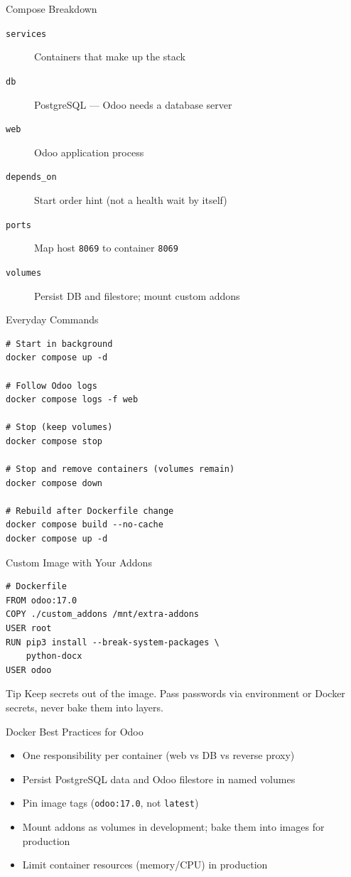 \begin{frame}{Compose Breakdown}
\begin{description}
  \item[\texttt{services}] Containers that make up the stack
  \item[\texttt{db}] PostgreSQL --- Odoo needs a database server
  \item[\texttt{web}] Odoo application process
  \item[\texttt{depends\_on}] Start order hint (not a health wait by itself)
  \item[\texttt{ports}] Map host \texttt{8069} to container \texttt{8069}
  \item[\texttt{volumes}] Persist DB and filestore; mount custom addons
\end{description}
\end{frame}

\begin{frame}[fragile]{Everyday Commands}
\begin{lstlisting}[style=bash]
# Start in background
docker compose up -d

# Follow Odoo logs
docker compose logs -f web

# Stop (keep volumes)
docker compose stop

# Stop and remove containers (volumes remain)
docker compose down

# Rebuild after Dockerfile change
docker compose build --no-cache
docker compose up -d
\end{lstlisting}
\end{frame}

\begin{frame}[fragile]{Custom Image with Your Addons}
\begin{lstlisting}[style=bash]
# Dockerfile
FROM odoo:17.0
COPY ./custom_addons /mnt/extra-addons
USER root
RUN pip3 install --break-system-packages \
    python-docx
USER odoo
\end{lstlisting}

\vspace{0.4em}
\begin{alertblock}{Tip}
  Keep secrets out of the image. Pass passwords via environment or Docker secrets, never bake them into layers.
\end{alertblock}
\end{frame}

\begin{frame}{Docker Best Practices for Odoo}
\begin{itemize}
  \item One responsibility per container (web vs DB vs reverse proxy)
  \item Persist PostgreSQL data and Odoo filestore in named volumes
  \item Pin image tags (\texttt{odoo:17.0}, not \texttt{latest})
  \item Mount addons as volumes in development; bake them into images for production
  \item Limit container resources (memory/CPU) in production
\end{itemize}
\end{frame}

